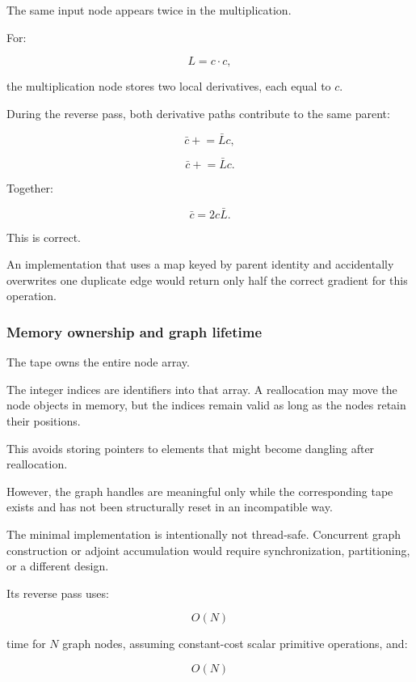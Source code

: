 The same input node appears twice in the multiplication.

For:

\[
L=c\cdot c,
\]

the multiplication node stores two local derivatives, each equal to \(c\).

During the reverse pass, both derivative paths contribute to the same parent:

\[
\bar c\mathrel{+}=\bar Lc,
\]

\[
\bar c\mathrel{+}=\bar Lc.
\]

Together:

\[
\bar c=2c\bar L.
\]

This is correct.

An implementation that uses a map keyed by parent identity and accidentally overwrites one duplicate edge would return only half the correct gradient for this operation.

\subsubsection{Memory ownership and graph lifetime}\label{02-foundations-ii-ch022-memory-ownership-and-graph-lifetime}

\hypertarget{02-foundations-ii-ch022-memory-ownership-and-graph-lifetime}{}

The tape owns the entire node array.

The integer indices are identifiers into that array. A  reallocation may move the node objects in memory, but the indices remain valid as long as the nodes retain their positions.

This avoids storing pointers to elements that might become dangling after reallocation.

However, the graph handles are meaningful only while the corresponding tape exists and has not been structurally reset in an incompatible way.

The minimal implementation is intentionally not thread-safe. Concurrent graph construction or adjoint accumulation would require synchronization, partitioning, or a different design.

Its reverse pass uses:

\[
O(N)
\]

time for \(N\) graph nodes, assuming constant-cost scalar primitive operations, and:

\[
O(N)
\]

